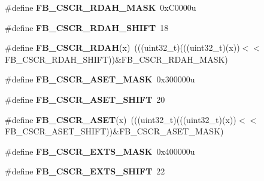 \begin{DoxyCompactItemize}
\item 
\#define {\bfseries F\+B\+\_\+\+C\+S\+C\+R\+\_\+\+R\+D\+A\+H\+\_\+\+M\+A\+SK}~0x\+C0000u\hypertarget{group__FB__Register__Masks_ga31adeea4793143604b28e1ca000b19df}{}\label{group__FB__Register__Masks_ga31adeea4793143604b28e1ca000b19df}

\item 
\#define {\bfseries F\+B\+\_\+\+C\+S\+C\+R\+\_\+\+R\+D\+A\+H\+\_\+\+S\+H\+I\+FT}~18\hypertarget{group__FB__Register__Masks_gaade1cbb82ddd98295330c376eabcca7e}{}\label{group__FB__Register__Masks_gaade1cbb82ddd98295330c376eabcca7e}

\item 
\#define {\bfseries F\+B\+\_\+\+C\+S\+C\+R\+\_\+\+R\+D\+AH}(x)~(((uint32\+\_\+t)(((uint32\+\_\+t)(x))$<$$<$F\+B\+\_\+\+C\+S\+C\+R\+\_\+\+R\+D\+A\+H\+\_\+\+S\+H\+I\+FT))\&F\+B\+\_\+\+C\+S\+C\+R\+\_\+\+R\+D\+A\+H\+\_\+\+M\+A\+SK)\hypertarget{group__FB__Register__Masks_ga54849fb23896ad9ddd312de4bb8d0a09}{}\label{group__FB__Register__Masks_ga54849fb23896ad9ddd312de4bb8d0a09}

\item 
\#define {\bfseries F\+B\+\_\+\+C\+S\+C\+R\+\_\+\+A\+S\+E\+T\+\_\+\+M\+A\+SK}~0x300000u\hypertarget{group__FB__Register__Masks_gaef9bac6317316a7b6d4e2df3526b206f}{}\label{group__FB__Register__Masks_gaef9bac6317316a7b6d4e2df3526b206f}

\item 
\#define {\bfseries F\+B\+\_\+\+C\+S\+C\+R\+\_\+\+A\+S\+E\+T\+\_\+\+S\+H\+I\+FT}~20\hypertarget{group__FB__Register__Masks_ga287d608bea3c47b85bdd3d707460da64}{}\label{group__FB__Register__Masks_ga287d608bea3c47b85bdd3d707460da64}

\item 
\#define {\bfseries F\+B\+\_\+\+C\+S\+C\+R\+\_\+\+A\+S\+ET}(x)~(((uint32\+\_\+t)(((uint32\+\_\+t)(x))$<$$<$F\+B\+\_\+\+C\+S\+C\+R\+\_\+\+A\+S\+E\+T\+\_\+\+S\+H\+I\+FT))\&F\+B\+\_\+\+C\+S\+C\+R\+\_\+\+A\+S\+E\+T\+\_\+\+M\+A\+SK)\hypertarget{group__FB__Register__Masks_gaa264e82012f6dff6f57409006aeb7f81}{}\label{group__FB__Register__Masks_gaa264e82012f6dff6f57409006aeb7f81}

\item 
\#define {\bfseries F\+B\+\_\+\+C\+S\+C\+R\+\_\+\+E\+X\+T\+S\+\_\+\+M\+A\+SK}~0x400000u\hypertarget{group__FB__Register__Masks_ga1bc7960fd554faa076ba6e34fddaf081}{}\label{group__FB__Register__Masks_ga1bc7960fd554faa076ba6e34fddaf081}

\item 
\#define {\bfseries F\+B\+\_\+\+C\+S\+C\+R\+\_\+\+E\+X\+T\+S\+\_\+\+S\+H\+I\+FT}~22\hypertarget{group__FB__Register__Masks_ga095a10ba51cbcdf10aca9bf9d5692613}{}\label{group__FB__Register__Masks_ga095a10ba51cbcdf10aca9bf9d5692613}


\end{DoxyCompactItemize}
